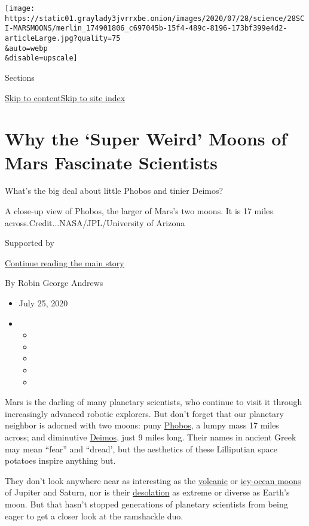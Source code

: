 \texttt{[image: https://static01.graylady3jvrrxbe.onion/images/2020/07/28/science/28SCI-MARSMOONS/merlin\_174901806\_c697045b-15f4-489c-8196-173bf399e4d2-articleLarge.jpg?quality=75\\\&auto=webp\\\&disable=upscale]}

Sections

\protect\hyperlink{site-content}{Skip to
content}\protect\hyperlink{site-index}{Skip to site index}

\hypertarget{why-the-super-weird-moons-of-mars-fascinate-scientists}{%
\section{Why the `Super Weird' Moons of Mars Fascinate
Scientists}\label{why-the-super-weird-moons-of-mars-fascinate-scientists}}

What's the big deal about little Phobos and tinier Deimos?

A close-up view of Phobos, the larger of Mars's two moons. It is 17
miles across.Credit...NASA/JPL/University of Arizona

Supported by

\protect\hyperlink{after-sponsor}{Continue reading the main story}

By Robin George Andrews

\begin{itemize}
\item
  July 25, 2020
\item
  \begin{itemize}
  \item
  \item
  \item
  \item
  \item
  \end{itemize}
\end{itemize}

Mars is the darling of many planetary scientists, who continue to visit
it through increasingly advanced robotic explorers. But don't forget
that our planetary neighbor is adorned with two moons: puny
\href{https://solarsystem.nasa.gov/moons/mars-moons/phobos/in-depth/}{Phobos},
a lumpy mass 17 miles across; and diminutive
\href{https://solarsystem.nasa.gov/moons/mars-moons/deimos/in-depth/}{Deimos},
just 9 miles long. Their names in ancient Greek may mean ``fear'' and
``dread', but the aesthetics of these Lilliputian space potatoes inspire
anything but.

They don't look anywhere near as interesting as the
\href{https://www.nytimes3xbfgragh.onion/2019/06/26/science/io-volcanic-moon.html}{volcanic}
or
\href{https://www.nytimes3xbfgragh.onion/2019/12/09/science/enceladus-stripes-moon.html}{icy-ocean
moons} of Jupiter and Saturn, nor is their
\href{https://www.nytimes3xbfgragh.onion/2019/07/12/science/nasa-moon-apollo-artemis.html}{desolation}
as extreme or diverse as Earth's moon. But that hasn't stopped
generations of planetary scientists from being eager to get a closer
look at the ramshackle duo.

